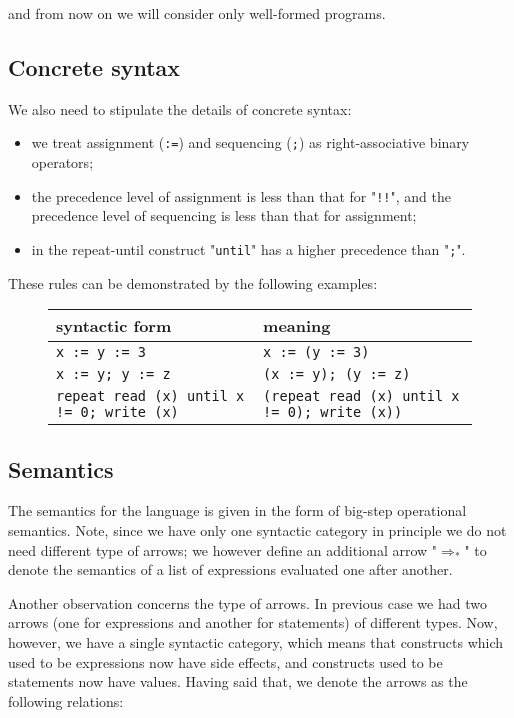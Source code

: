 \documentclass{article}
\newcommand{\llang}[1]{\mbox{\lstinline[mathescape]|#1|}}
\theoremstyle{definition}
\begin{document}
and from now on we will consider only well-formed programs.

\subsection{Concrete syntax}

We also need to stipulate the details of concrete syntax:

\begin{itemize}
\item we treat assignment (\llang{:=}) and sequencing (\llang{;}) as right-associative binary operators;
\item the precedence level of assignment is less than that for "\llang{!!}", and the precedence level of sequencing is less than that for
  assignment;
\item in the repeat-until construct "\llang{until}" has a higher precedence than "\llang{;}".
\end{itemize}

These rules can be demonstrated by the following examples:

\begin{figure}[h]
\begin{tabular}{ll}
  syntactic form & meaning \\
  \hline
  \llang{x := y := 3}    & \llang{x := (y := 3)}      \\
  \llang{x := y; y := z} & \llang{(x := y); (y := z)} \\
  \llang{repeat read (x) until x != 0; write (x)} & \llang{(repeat read (x) until x != 0); write (x))}
\end{tabular}
\end{figure}

\subsection{Semantics}

The semantics for the language is given in the form of big-step operational semantics. Note, since we have only one syntactic category in principle we do
not need different type of arrows; we however define an additional arrow "$\Rightarrow_*$" to denote the semantics of a list of expressions
evaluated one after another.

Another observation concerns the type of arrows. In previous case we had two arrows (one for expressions and another for statements) of different types.
Now, however, we have a single syntactic category, which means that constructs which used to be expressions now have side effects, and
constructs used to be statements now have values. Having said that, we denote the arrows as the following relations:
\end{document}
